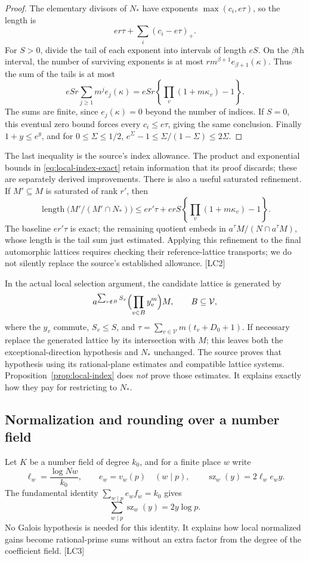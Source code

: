 \begin{proof}
The elementary divisors of $N_*$ have exponents $\max(c_i,e\tau)$, so the length is
\[
er\tau+\sum_i(c_i-e\tau)_+.
\]
For $S>0$, divide the tail of each exponent into intervals of length $eS$. On the $\beta$th interval, the number of surviving exponents is at most $r m^{\beta+1}e_{\beta+1}(\kappa)$. Thus the sum of the tails is at most
\[
eSr\sum_{j\ge1}m^j e_j(\kappa)
=eSr\left\{\prod_v(1+m\kappa_v)-1\right\}.
\]
The sums are finite, since $e_j(\kappa)=0$ beyond the number of indices. If $S=0$, this eventual zero bound forces every $c_i\le e\tau$, giving the same conclusion. Finally $1+y\le e^y$, and for $0\le\Sigma\le1/2$,
$e^\Sigma-1\le\Sigma/(1-\Sigma)\le2\Sigma$.
\end{proof}

The last inequality is the source's index allowance. The product and exponential bounds in \eqref{eq:local-index-exact} retain information that its proof discards; these are separately derived improvements. There is also a useful saturated refinement. If $M'\subseteq M$ is saturated of rank $r'$, then
\[
\operatorname{length}\bigl(M'/(M'\cap N_*)\bigr)
\le er'\tau+erS\left\{\prod_v(1+m\kappa_v)-1\right\}.
\]
The baseline $er'\tau$ is exact; the remaining quotient embeds in $a^\tau M/(N\cap a^\tau M)$, whose length is the tail sum just estimated. Applying this refinement to the final automorphic lattices requires checking their reference-lattice transports; we do not silently replace the source's established allowance. \textsf{[LC2]}

In the actual local selection argument, the candidate lattice is generated by
\[
a^{\sum_{v\notin B}S_v}\Bigl(\prod_{v\in B}y_v^m\Bigr)M,
\qquad B\subseteq\mathcal V,
\]
where the $y_v$ commute, $S_v\le S$, and
$\tau=\sum_{v\in\mathcal V}m(t_v+D_0+1)$. If necessary replace the generated lattice by its intersection with $M$; this leaves both the exceptional-direction hypothesis and $N_*$ unchanged. The source proves that hypothesis using its rational-plane estimates and compatible lattice systems. Proposition~\ref{prop:local-index} does \emph{not} prove those estimates. It explains exactly how they pay for restricting to $N_*$.\cite{local-systems}

\subsection{Normalization and rounding over a number field}

Let $K$ be a number field of degree $k_0$, and for a finite place $w$ write
\[
\ell_w=\frac{\log Nw}{k_0},\qquad e_w=v_w(p)\quad(w\mid p),
\qquad \operatorname{sz}_w(y)=2\ell_w e_w y.
\]
The fundamental identity $\sum_{w\mid p}e_w f_w=k_0$ gives
\begin{equation}\label{eq:prime-normalization}
\sum_{w\mid p}\operatorname{sz}_w(y)=2y\log p.
\end{equation}
No Galois hypothesis is needed for this identity. It explains how local normalized gains become rational-prime sums without an extra factor from the degree of the coefficient field. \textsf{[LC3]}\cite{local-normalization}


